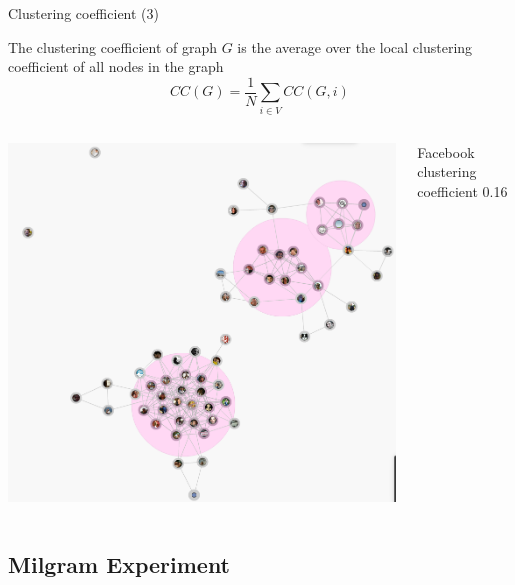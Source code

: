 \begin{frame}{Clustering coefficient (3)}

\begin{definition}

The \alert{clustering coefficient} of graph $G$ is the average over the local 
  clustering coefficient of all nodes in the graph
  \[
     CC(G) = \frac{1}{N} \sum_{i \in V} CC(G,i)
  \]
\end{definition}

\begin{columns}
	\begin{column}{0.35\textwidth}
		\includegraphics[width=\textwidth]{figs/08/facebook}
	\end{column}
	\begin{column}{0.65\textwidth}
		\BI
		\item Facebook clustering coefficient 0.16
		\EI
	\end{column}
\end{columns}
\end{frame}

\subsection{Milgram Experiment}

